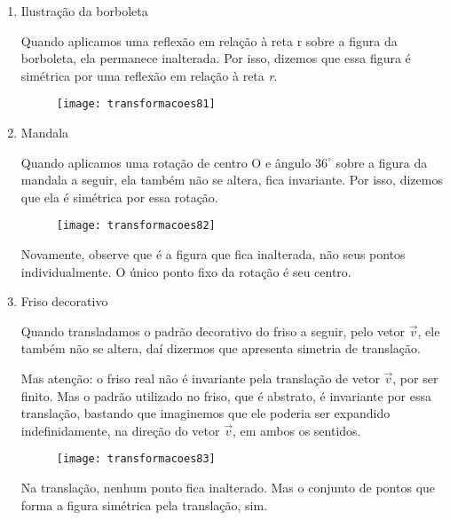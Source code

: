 \begin{enumerate}[label=\titem{\arabic*. }]
\item Ilustração da borboleta

Quando aplicamos uma reflexão em relação à reta r sobre a figura da borboleta, ela permanece inalterada. Por isso, dizemos que essa figura é simétrica por uma reflexão em relação à reta \textit{r}.

\begin{figure}[H]
\centering

\texttt{[image: transformacoes81]}
\end{figure}


\item Mandala

Quando aplicamos uma rotação de centro O e ângulo $36^{\circ}$ sobre a figura da mandala a seguir, ela também não se altera, fica invariante. Por isso, dizemos que ela é simétrica por essa rotação. 
 
\begin{figure}[H]
\centering

\texttt{[image: transformacoes82]}
\end{figure}

Novamente, observe que é a figura que fica inalterada, não seus pontos individualmente. O único ponto fixo da rotação é seu centro. 


\item Friso decorativo

Quando transladamos o padrão decorativo do friso a seguir, pelo vetor $\overrightarrow{v}$, ele também não se altera, daí dizermos que apresenta simetria de translação. 

Mas atenção: o friso real não é invariante pela translação de vetor $\overrightarrow{v}$, por ser finito. Mas o padrão utilizado no friso, que é abstrato, é invariante por essa translação, bastando que imaginemos que ele poderia ser expandido indefinidamente, na direção do vetor $\overrightarrow{v}$, em ambos os sentidos.

\begin{figure}[H]
\centering

\texttt{[image: transformacoes83]}
\end{figure}

Na translação, nenhum ponto fica inalterado. Mas o conjunto de pontos que forma a figura simétrica pela translação, sim.

\end{enumerate}

